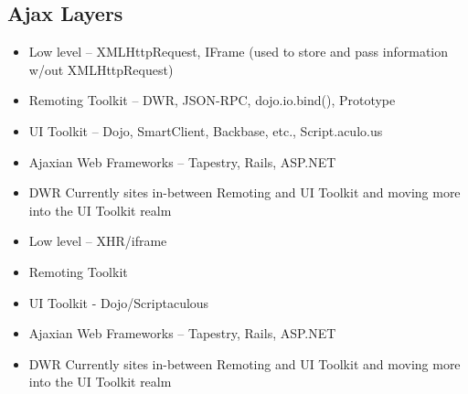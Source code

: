 \begin{ifhtml}
\begin{s5slide}
        \section{Ajax Layers}
            \begin{itemize}
                \item Low level – XMLHttpRequest, IFrame (used to store and pass information w/out XMLHttpRequest)
                \item Remoting Toolkit – DWR, JSON-RPC, dojo.io.bind(), Prototype
                \item UI Toolkit – Dojo, SmartClient, Backbase, etc., Script.aculo.us
                \item Ajaxian Web Frameworks – Tapestry, Rails, ASP.NET
            \end{itemize}
            \begin{itemize}
                \item DWR Currently sites in-between Remoting and UI Toolkit and moving more into the UI Toolkit realm
            \end{itemize}
            \begin{s5notes}
                \begin{itemize}
                    \item Low level – XHR/iframe
                    \item Remoting Toolkit
                    \item UI Toolkit - Dojo/Scriptaculous
                    \item Ajaxian Web Frameworks – Tapestry, Rails, ASP.NET
                \end{itemize}
                \begin{itemize}
                    \item DWR Currently sites in-between Remoting and UI Toolkit and moving more into the UI Toolkit realm
                \end{itemize}
            \end{s5notes}
    \end{s5slide}
    \begin{s5slide}

\end{s5slide}
\end{ifhtml}
